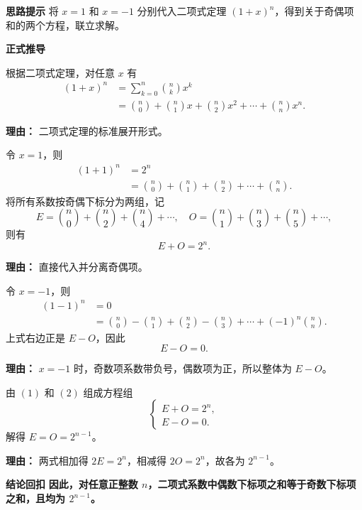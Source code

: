 \begin{proofbox}
	\textbf{\textcolor{CProof}{思路提示}}
	将 $x=1$ 和 $x=-1$ 分别代入二项式定理 $(1+x)^n$，得到关于奇偶项和的两个方程，联立求解。

	\medskip
	\textbf{\textcolor{CProof}{正式推导}}
	\begin{description}[style=nextline, leftmargin=2.8em, labelsep=0.5em, itemsep=0.55em]
		\item[\textbf{步骤一（二项展开）：}]
			根据二项式定理，对任意 $x$ 有
			\[
				\begin{aligned}
					(1+x)^n &= \sum_{k=0}^{n} \binom{n}{k} x^k \\ &= \binom{n}{0} + \binom{n}{1}x + \binom{n}{2}x^2 + \cdots + \binom{n}{n}x^n.
			\end{aligned}
			\]
			\par\textbf{理由：} 二项式定理的标准展开形式。
		\item[\textbf{步骤二（代入 $x=1$）：}]
			令 $x=1$，则
			\[
				\begin{aligned}
					(1+1)^n &= 2^n \\ &= \binom{n}{0} + \binom{n}{1} + \binom{n}{2} + \cdots + \binom{n}{n}.
			\end{aligned}
			\]
			将所有系数按奇偶下标分为两组，记
			\[
				E = \binom{n}{0} + \binom{n}{2} + \binom{n}{4} + \cdots, \quad O = \binom{n}{1} + \binom{n}{3} + \binom{n}{5} + \cdots,
			\]
			则有
			\[
				E + O = 2^n. \tag{1}
			\]
			\par\textbf{理由：} 直接代入并分离奇偶项。
		\item[\textbf{步骤三（代入 $x=-1$）：}]
			令 $x=-1$，则
			\[
				\begin{aligned}
					(1-1)^n &= 0 \\ &= \binom{n}{0} - \binom{n}{1} + \binom{n}{2} - \binom{n}{3} + \cdots + (-1)^n\binom{n}{n}.
			\end{aligned}
			\]
			上式右边正是 $E - O$，因此
			\[
				E - O = 0. \tag{2}
			\]
			\par\textbf{理由：} $x=-1$ 时，奇数项系数带负号，偶数项为正，所以整体为 $E - O$。
		\item[\textbf{步骤四（联立求解）：}]
			由 $(1)$ 和 $(2)$ 组成方程组
			\[
				\begin{cases}
					E + O = 2^n,\\ E - O = 0.
			\end{cases}
			\]
			解得 $E = O = 2^{n-1}$。
			\par\textbf{理由：} 两式相加得 $2E = 2^n$，相减得 $2O = 2^n$，故各为 $2^{n-1}$。
	\end{description}

	\medskip
	\textbf{\textcolor{CProof}{结论回扣}}
	\textbf{因此，对任意正整数 $n$，二项式系数中偶数下标项之和等于奇数下标项之和，且均为 $2^{n-1}$。}
\end{proofbox}
